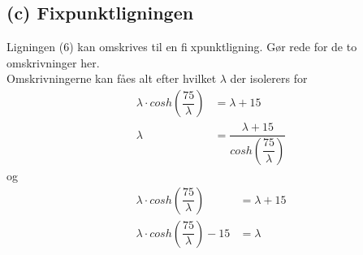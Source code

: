 \subsection*{(c) Fixpunktligningen}
 Ligningen (6) kan omskrives til en fixpunktligning. Gør rede for de to omskrivninger her.\\
Omskrivningerne kan fåes alt efter hvilket $\lambda$ der isolerers for
\begin{align*}
\lambda \cdot cosh(\dfrac{75}{\lambda})&=\lambda+15\\
\lambda&=\dfrac{\lambda+15}{cosh(\dfrac{75}{\lambda})}
\end{align*}
og
\begin{align*}
\lambda \cdot cosh(\dfrac{75}{\lambda})&=\lambda+15\\
\lambda \cdot cosh(\dfrac{75}{\lambda})-15 &=\lambda
\end{align*}
